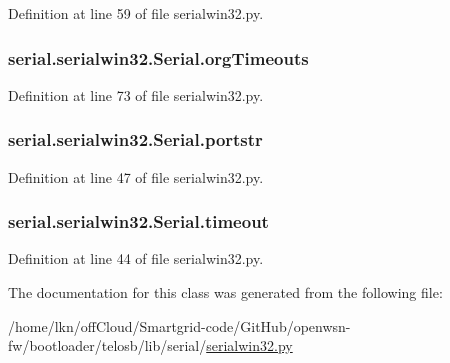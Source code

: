 Definition at line 59 of file serialwin32.\+py.

\subsubsection[{\texorpdfstring{org\+Timeouts}{orgTimeouts}}]{\setlength{\rightskip}{0pt plus 5cm}serial.\+serialwin32.\+Serial.\+org\+Timeouts}\hypertarget{classserial_1_1serialwin32_1_1_serial_ad83b96a33d9ff14a24564e3edd6a13d5}{}\label{classserial_1_1serialwin32_1_1_serial_ad83b96a33d9ff14a24564e3edd6a13d5}


Definition at line 73 of file serialwin32.\+py.

\subsubsection[{\texorpdfstring{portstr}{portstr}}]{\setlength{\rightskip}{0pt plus 5cm}serial.\+serialwin32.\+Serial.\+portstr}\hypertarget{classserial_1_1serialwin32_1_1_serial_ac8af1a65407a925ad3a0f8e1a704e054}{}\label{classserial_1_1serialwin32_1_1_serial_ac8af1a65407a925ad3a0f8e1a704e054}


Definition at line 47 of file serialwin32.\+py.

\subsubsection[{\texorpdfstring{timeout}{timeout}}]{\setlength{\rightskip}{0pt plus 5cm}serial.\+serialwin32.\+Serial.\+timeout}\hypertarget{classserial_1_1serialwin32_1_1_serial_ae703b88bd0d51ad74f5a26930a87c4ae}{}\label{classserial_1_1serialwin32_1_1_serial_ae703b88bd0d51ad74f5a26930a87c4ae}


Definition at line 44 of file serialwin32.\+py.



The documentation for this class was generated from the following file\+:\begin{DoxyCompactItemize}
\item 
/home/lkn/off\+Cloud/\+Smartgrid-\/code/\+Git\+Hub/openwsn-\/fw/bootloader/telosb/lib/serial/\hyperlink{serialwin32_8py}{serialwin32.\+py}\end{DoxyCompactItemize}
